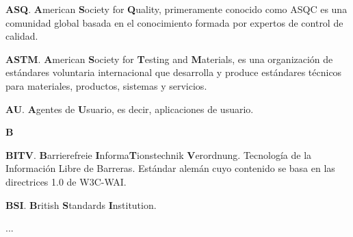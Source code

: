 \documentclass[a4paper]{article}
\newcommand\textstyleProyectoNegrita[1]{\textbf{#1}}
\begin{document}
{
\textstyleProyectoNegrita{{ASQ}}{. }\textstyleProyectoNegrita{{A}}{merican }\textstyleProyectoNegrita{{S}}{ociety for }\textstyleProyectoNegrita{{Q}}{uality, primeramente conocido como ASQC es una comunidad global basada en el conocimiento formada por expertos de control de calidad. }}

{
\textstyleProyectoNegrita{{ASTM}}{. }\textstyleProyectoNegrita{{A}}{merican }\textstyleProyectoNegrita{{S}}{ociety for }\textstyleProyectoNegrita{{T}}{esting and }\textstyleProyectoNegrita{{M}}{aterials, es una organización de estándares voluntaria internacional que desarrolla y produce estándares técnicos para materiales, productos, sistemas y servicios.}}

{
\textstyleProyectoNegrita{{A}}\textstyleProyectoNegrita{{U}}{. }\textstyleProyectoNegrita{{A}}{gentes de }\textstyleProyectoNegrita{{U}}{suario, es decir, aplicaciones de usuario.}}

{\bfseries
\textstyleProyectoNegrita{{\textmd{B}}}}

{
\textstyleProyectoNegrita{{BITV}}{. }\textstyleProyectoNegrita{{B}}{arrierefreie }\textstyleProyectoNegrita{{I}}{nforma}\textstyleProyectoNegrita{{T}}{ionstechnik }\textstyleProyectoNegrita{{V}}{erordnung. }{Tecnología de la Información Libre de Barreras. Estándar alemán cuyo contenido se basa en las directrices 1.0 de W3C-WAI.}}

{
\textstyleProyectoNegrita{BSI}. \textstyleProyectoNegrita{B}ritish \textstyleProyectoNegrita{S}tandards \textstyleProyectoNegrita{I}nstitution.}

{
...}


\bigskip


\bigskip

\clearpage\clearpage\setcounter{page}{1}\pagestyle{Convertirxviii}

\bigskip


\bigskip
\end{document}

